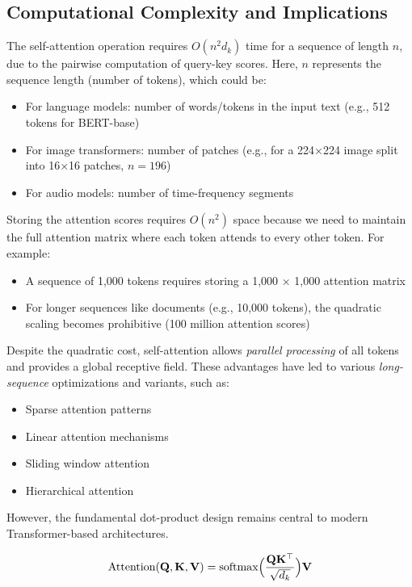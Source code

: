 \subsection{Computational Complexity and Implications}
\noindent
The self-attention operation requires $O(n^2 d_k)$ time for a sequence of length $n$, due to the pairwise computation of query-key scores. Here, $n$ represents the sequence length (number of tokens), which could be:
\begin{itemize}
    \item For language models: number of words/tokens in the input text (e.g., 512 tokens for BERT-base)
    \item For image transformers: number of patches (e.g., for a 224×224 image split into 16×16 patches, $n = 196$)
    \item For audio models: number of time-frequency segments
\end{itemize}

\noindent
Storing the attention scores requires $O(n^2)$ space because we need to maintain the full attention matrix where each token attends to every other token. For example:
\begin{itemize}
    \item A sequence of 1,000 tokens requires storing a 1,000 × 1,000 attention matrix
    \item For longer sequences like documents (e.g., 10,000 tokens), the quadratic scaling becomes prohibitive (100 million attention scores)
\end{itemize}

Despite the quadratic cost, self-attention allows \emph{parallel processing} of all tokens and provides a global receptive field. These advantages have led to various \emph{long-sequence} optimizations and variants, such as:
\begin{itemize}
    \item Sparse attention patterns~\cite{brown2020language}
    \item Linear attention mechanisms~\cite{devlin2018bert}
    \item Sliding window attention~\cite{liu2019roberta}
    \item Hierarchical attention~\cite{bahdanau2014neural}
\end{itemize}

However, the fundamental dot-product design remains central to modern Transformer-based architectures.

\begin{equation}\label{eq:attention_mechanism}
\text{Attention}(\mathbf{Q}, \mathbf{K}, \mathbf{V}) 
= \text{softmax}\Bigl(\frac{\mathbf{Q}\mathbf{K}^\top}{\sqrt{d_k}}\Bigr)\mathbf{V}
\end{equation}

